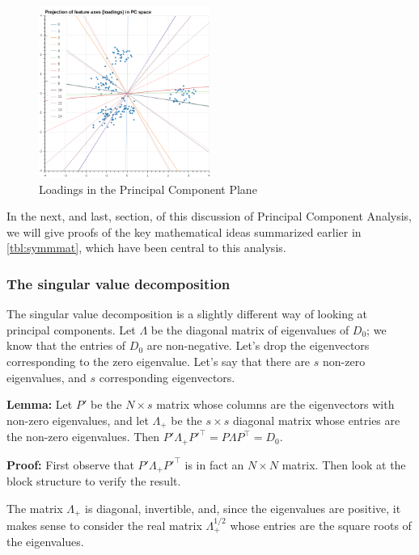 \documentclass[
]{article}
\begin{document}
\begin{figure}
\hypertarget{fig:loadings}{%
\centering
\includegraphics[width=0.5\textwidth,height=\textheight]{../img/loading.png}
\caption{Loadings in the Principal Component Plane}\label{fig:loadings}
}
\end{figure}

In the next, and last, section, of this discussion of Principal
Component Analysis, we will give proofs of the key mathematical ideas
summarized earlier in \cref{tbl:symmmat}, which have been central to
this analysis.

\hypertarget{sec:svd}{%
\subsubsection{The singular value decomposition}\label{sec:svd}}

The singular value decomposition is a slightly different way of looking
at principal components. Let \(\Lambda\) be the diagonal matrix of
eigenvalues of \(D_{0}\); we know that the entries of \(D_{0}\) are
non-negative. Let's drop the eigenvectors corresponding to the zero
eigenvalue. Let's say that there are \(s\) non-zero eigenvalues, and
\(s\) corresponding eigenvectors.

\textbf{Lemma:} Let \(P'\) be the \(N\times s\) matrix whose columns are
the eigenvectors with non-zero eigenvalues, and let \(\Lambda_{+}\) be
the \(s\times s\) diagonal matrix whose entries are the non-zero
eigenvalues. Then
\(P'\Lambda_{+} P'^{\intercal} = P\Lambda P^{\intercal} = D_{0}\).

\textbf{Proof:} First observe that \(P'\Lambda_{+}P'^{\intercal}\) is in
fact an \(N\times N\) matrix. Then look at the block structure to verify
the result.

The matrix \(\Lambda_{+}\) is diagonal, invertible, and, since the
eigenvalues are positive, it makes sense to consider the real matrix
\(\Lambda_{+}^{1/2}\) whose entries are the square roots of the
eigenvalues.
\end{document}
